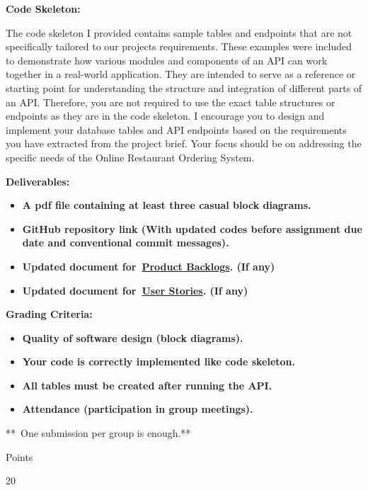 \documentclass[
]{article}
\providecommand{\tightlist}{%
  \setlength{\itemsep}{0pt}\setlength{\parskip}{0pt}}
\begin{document}
\textbf{Code Skeleton:}

The code skeleton I provided contains sample tables and endpoints that
are not specifically tailored to our project\textquotesingle s
requirements. These examples were included to demonstrate how various
modules and components of an API can work together in a real-world
application. They are intended to serve as a reference or starting point
for understanding the structure and integration of different parts of an
API. Therefore, you are not required to use the exact table structures
or endpoints as they are in the code skeleton. I encourage you to design
and implement your database tables and API endpoints based on the
requirements you have extracted from the project brief. Your focus
should be on addressing the specific needs of the Online Restaurant
Ordering System.

\textbf{Deliverables:}

\begin{itemize}
\item
  \textbf{A pdf file containing at least three casual block diagrams.}
\item
  \textbf{GitHub repository link (With updated codes before assignment
  due date and conventional commit messages).}
\item
  \textbf{Updated document
  for~\textbf{\href{https://instructure.charlotte.edu/courses/264138/files/33808457?wrap=1}{\textbf{Product
  Backlogs}}}. (If any)}
\item
  \textbf{Updated document
  for~\textbf{\href{https://instructure.charlotte.edu/courses/264138/files/33808471?wrap=1}{\textbf{User
  Stories}}}. (If any)}
\end{itemize}

\textbf{Grading Criteria:}

\begin{itemize}
\tightlist
\item
  \textbf{Quality of software design (block diagrams).}
\item
  \textbf{Your code is correctly implemented like code skeleton.}
\item
  \textbf{All tables must be created after running the API.}
\item
  \textbf{Attendance (participation in group meetings).}
\end{itemize}

**~One submission per group is enough.**

Points

20
\end{document}

